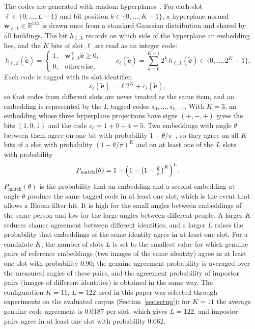 \documentclass[pdflatex,sn-mathphys-num]{sn-jnl}%
\theoremstyle{thmstyleone}%
\theoremstyle{thmstyletwo}%
\theoremstyle{thmstylethree}%
\begin{document}
The codes are generated with random hyperplanes~\cite{charikar2002}. For each slot $\ell\in\{0,\ldots,L-1\}$ and bit position $k\in\{0,\ldots,K-1\}$, a hyperplane normal $\mathbf{w}_{\ell,k}\in\mathbb{R}^{512}$ is drawn once from a standard Gaussian distribution and shared by all buildings. The bit $h_{\ell,k}$ records on which side of the hyperplane an embedding lies, and the $K$ bits of slot $\ell$ are read as an integer code:
\begin{equation}
    h_{\ell,k}(\tilde{\mathbf{e}}) =
    \begin{cases}
        1, & \mathbf{w}_{\ell,k}^\top\tilde{\mathbf{e}} \geq 0,\\
        0, & \text{otherwise},
    \end{cases}
    \qquad
    c_\ell(\tilde{\mathbf{e}}) = \sum_{k=0}^{K-1} 2^{k}\, h_{\ell,k}(\tilde{\mathbf{e}}) \in \{0,\ldots,2^K-1\}.
    \label{eq:lsh_bit}
\end{equation}
Each code is tagged with its slot identifier,
\begin{equation}
    s_\ell(\tilde{\mathbf{e}})
    =
    \ell 2^K + c_\ell(\tilde{\mathbf{e}}),
    \label{eq:tagged_code}
\end{equation}
so that codes from different slots are never treated as the same item, and an embedding is represented by the $L$ tagged codes $s_0,\ldots,s_{L-1}$. With $K=3$, an embedding whose three hyperplane projections have signs $(+,-,+)$ gives the bits $(1,0,1)$ and the code $c_\ell = 1+0+4 = 5$. Two embeddings with angle $\theta$ between them agree on one bit with probability $1-\theta/\pi$~\cite{charikar2002}, so they agree on all $K$ bits of a slot with probability $(1-\theta/\pi)^K$ and on at least one of the $L$ slots with probability
\begin{equation}
    P_{\mathrm{match}}(\theta)=1-\Bigl(1-\bigl(1-\tfrac{\theta}{\pi}\bigr)^{K}\Bigr)^{L}.
    \label{eq:slot_agreement}
\end{equation}
$P_{\mathrm{match}}(\theta)$ is the probability that an embedding and a second embedding at angle $\theta$ produce the same tagged code in at least one slot, which is the event that allows a Bloom-filter hit. It is high for the small angles between embeddings of the same person and low for the large angles between different people. A larger $K$ reduces chance agreement between different identities, and a larger $L$ raises the probability that embeddings of the same identity agree in at least one slot. For a candidate $K$, the number of slots $L$ is set to the smallest value for which genuine pairs of reference embeddings (two images of the same identity) agree in at least one slot with probability 0.90; the genuine agreement probability is averaged over the measured angles of these pairs, and the agreement probability of impostor pairs (images of different identities) is obtained in the same way. The configuration $K=11$, $L=122$ used in this paper was selected through experiments on the evaluated corpus (Section~\ref{sec:setup}); for $K=11$ the average genuine code agreement is 0.0187 per slot, which gives $L=122$, and impostor pairs agree in at least one slot with probability 0.062.
\end{document}
